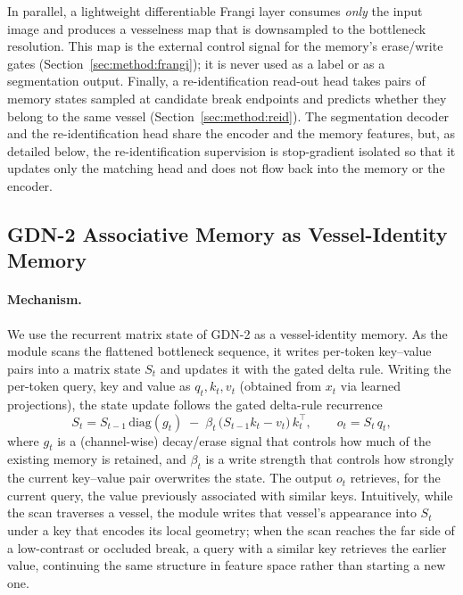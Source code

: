 In parallel, a lightweight differentiable Frangi layer consumes \emph{only} the
input image and produces a vesselness map that is downsampled to the bottleneck
resolution. This map is the external control signal for the memory's erase/write
gates (Section~\ref{sec:method:frangi}); it is never used as a label or as a
segmentation output. Finally, a re-identification read-out head takes pairs of
memory states sampled at candidate break endpoints and predicts whether they belong
to the same vessel (Section~\ref{sec:method:reid}). The segmentation decoder and the
re-identification head share the encoder and the memory features, but, as detailed
below, the re-identification supervision is stop-gradient isolated so that it updates
only the matching head and does not flow back into the memory or the encoder.

\subsection{GDN-2 Associative Memory as Vessel-Identity Memory}
\label{sec:method:memory}

\paragraph{Mechanism.}
We use the recurrent matrix state of GDN-2 as a vessel-identity memory. As the
module scans the flattened bottleneck sequence, it writes per-token key--value
pairs into a matrix state $S_t$ and updates it with the gated delta rule. Writing
the per-token query, key and value as $q_t, k_t, v_t$ (obtained from $x_t$ via
learned projections), the state update follows the gated delta-rule recurrence
\begin{equation}
  S_t = S_{t-1}\,\mathrm{diag}(g_t)\;-\;\beta_t\,\bigl(S_{t-1} k_t - v_t\bigr)\,k_t^{\top},
  \qquad
  o_t = S_t\, q_t ,
  \label{eq:gdn2}
\end{equation}
where $g_t$ is a (channel-wise) decay/erase signal that controls how much of the
existing memory is retained, and $\beta_t$ is a write strength that controls how
strongly the current key--value pair overwrites the state. The output $o_t$
retrieves, for the current query, the value previously associated with similar keys.
Intuitively, while the scan traverses a vessel, the module writes that vessel's
appearance into $S_t$ under a key that encodes its local geometry; when the scan
reaches the far side of a low-contrast or occluded break, a query with a similar key
retrieves the earlier value, continuing the same structure in feature space rather
than starting a new one.

